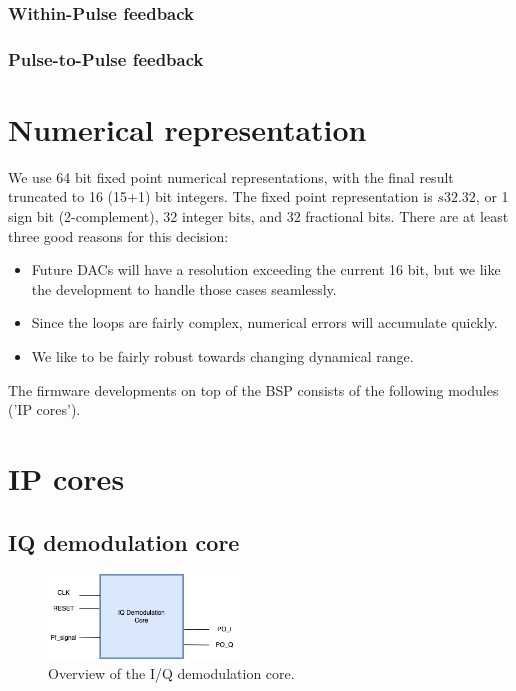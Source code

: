 \documentclass[12pt]{amsart}
\begin{document}
\subsubsection{Within-Pulse feedback}


\subsubsection{Pulse-to-Pulse feedback}

\section{Numerical representation}

We use 64 bit fixed point numerical representations, with the final result truncated to 16 (15+1) bit integers.
The fixed point representation is $s32.32$, or 
1 sign bit (2-complement), 32 integer bits, and $32$ fractional bits. 
There are at least three good reasons for this decision:
\begin{itemize}
\item Future DACs will have a resolution exceeding the current 16 bit, but we like the development to handle those cases seamlessly.
\item Since the loops are fairly complex, numerical errors will accumulate quickly.
\item We like to be fairly robust towards changing dynamical range.
\end{itemize}
The firmware developments on top of the BSP consists of the following modules ('IP cores').

\section{IP cores}

\subsection{IQ demodulation core}

\begin{figure}[htbp] %
   \centering
   \includegraphics[width=2in]{im/IQcore.png} 
   \caption{Overview of the I/Q demodulation core.}
   \label{fig:iqcore}
\end{figure}
\end{document}

